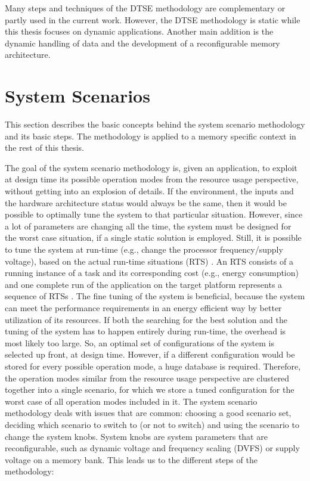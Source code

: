 Many steps and techniques of the DTSE methodology are complementary or partly used in the current work.
However, the DTSE methodology is static while this thesis focuses on dynamic applications.
Another main addition is the dynamic handling of data and the development of a reconfigurable memory architecture.

\section{System Scenarios}

This section describes the basic concepts behind the system scenario methodology and its basic steps.
The methodology is applied to a memory specific context in the rest of this thesis. 

The goal of the system scenario methodology is, given an application, to exploit at design time its possible operation modes from the resource usage perspective, without getting into an explosion of details. 
If the environment, the inputs and the hardware architecture status would always be the same, then it would be possible to optimally tune the system to that particular situation. 
However, since a lot of parameters are changing all the time, the system must be designed for the worst case situation, if a single static solution is employed. 
Still, it is possible to tune the system at run-time (e.g., change the processor frequency/supply voltage), based on the actual run-time situations (RTS) . 
An RTS consists of a running instance of a task and its corresponding cost (e.g., energy consumption) and one complete run of the application on the target platform represents a sequence of RTSs \cite{Elena2010}. 
The fine tuning of the system is beneficial, because the system can meet the performance requirements in an energy efficient way by better utilization of its resources. 
If both the searching for the best solution and the tuning of the system has to happen entirely during run-time, the overhead is most likely too large.
So, an optimal set of configurations of the system is selected up front, at design time. 
However, if a different configuration would be stored for every possible operation mode, a huge database is required. 
Therefore, the operation modes similar from the resource usage perspective are clustered together into a single scenario, for which we store a tuned configuration for the worst case of all operation modes included in it.
The system scenario methodology deals with issues that are common: choosing a good scenario set, deciding which scenario to switch to (or not to switch) and using the scenario to change the system knobs.
System knobs are system parameters that are reconfigurable, such as dynamic voltage and frequency scaling (DVFS)  or supply voltage on a memory bank. 
This leads us to the different steps of the methodology:

